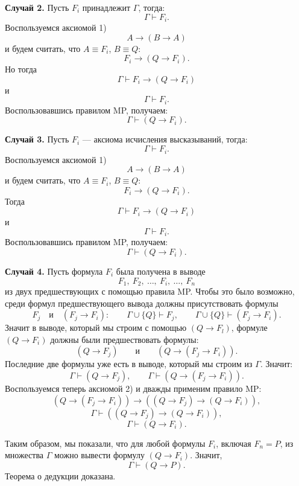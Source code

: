\documentclass[12pt,letterpaper]{article}
\begin{document}
\textbf{Случай 2.} Пусть $F_i$ принадлежит $\Gamma$, тогда:
\[
\Gamma \vdash F_i.
\]
Воспользуемся аксиомой 1)
\[
A \to (B \to A)
\]
и будем считать, что $A \equiv F_i$, $B \equiv Q$:
\[
F_i \to (Q \to F_i).
\]
Но тогда
\[
\Gamma \vdash F_i \to (Q \to F_i)
\]
и
\[
\Gamma \vdash F_i.
\]
Воспользовавшись правилом MP, получаем:
\[
\Gamma \vdash (Q \to F_i).
\]

\textbf{Случай 3.} Пусть $F_i$ --- аксиома исчисления высказываний, тогда:
\[
\Gamma \vdash F_i.
\]
Воспользуемся аксиомой 1)
\[
A \to (B \to A)
\]
и будем считать, что $A \equiv F_i$, $B \equiv Q$:
\[
F_i \to (Q \to F_i).
\]
Тогда
\[
\Gamma \vdash F_i \to (Q \to F_i)
\]
и
\[
\Gamma \vdash F_i.
\]
Воспользовавшись правилом MP, получаем:
\[
\Gamma \vdash (Q \to F_i).
\]

\textbf{Случай 4.} Пусть формула $F_i$ была получена в выводе
\[
F_1,\ F_2,\ \dots,\ F_i,\ \dots,\ F_n
\]
из двух предшествующих с помощью правила MP. Чтобы это было возможно, среди формул предшествующего вывода должны присутствовать формулы
\[
F_j \quad \text{и} \quad (F_j \to F_i):
\qquad
\Gamma \cup \{Q\}\vdash F_j,\qquad \Gamma \cup \{Q\}\vdash (F_j \to F_i).
\]
Значит в выводе, который мы строим с помощью $(Q \to F_l)$, формуле $(Q \to F_i)$ должны были предшествовать формулы:
\[
(Q \to F_j)\qquad \text{и} \qquad (Q \to (F_j \to F_i)).
\]
Последние две формулы уже есть в выводе, который мы строим из $\Gamma$. Значит:
\[
\Gamma \vdash (Q \to F_j),\qquad \Gamma \vdash (Q \to (F_j \to F_i)).
\]
Воспользуемся теперь аксиомой 2) и дважды применим правило MP:
\[
(Q \to (F_j \to F_i)) \to ((Q \to F_j) \to (Q \to F_i)),
\]
\[
\Gamma \vdash ((Q \to F_j) \to (Q \to F_i)),
\]
\[
\Gamma \vdash (Q \to F_i).
\]

Таким образом, мы показали, что для любой формулы $F_i$, включая $F_n=P$, из множества $\Gamma$ можно вывести формулу $(Q \to F_i)$. Значит,
\[
\Gamma \vdash (Q \to P).
\]
Теорема о дедукции доказана.
\end{document}
